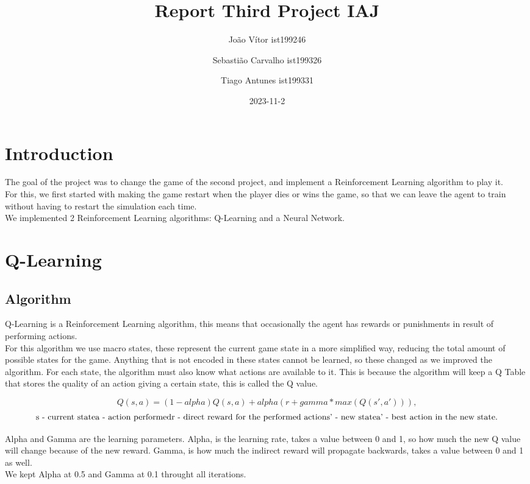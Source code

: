 \documentclass{article}
\title{Report Third Project IAJ}
\author{João Vítor ist199246
  \and Sebastião Carvalho ist199326
  \and Tiago Antunes ist199331}
\date{2023-11-2}
\begin{document}
  \maketitle
  \tableofcontents
  \newpage
  \section{Introduction}
  The goal of the project was to change the game of the second project, and implement a Reinforcement Learning algorithm to play it.\\
  For this, we first started with making the game restart when the player dies or wins the game, so that we can leave the agent to train
  without having to restart the simulation each time.\\
  We implemented 2 Reinforcement Learning algorithms: Q-Learning and a Neural Network.\\
  \section{Q-Learning}
  \subsection{Algorithm}
  Q-Learning is a Reinforcement Learning algorithm, this means that occasionally the agent has rewards or punishments in result of
  performing actions.\\
  For this algorithm we use macro states, these represent the current game state in a more simplified way, reducing the total
  amount of possible states for the game. Anything that is not encoded in these states cannot be learned, so these changed as
  we improved the algorithm. For each state, the algorithm must also know what actions are available to it. This is because the
  algorithm will keep a Q Table that stores the quality of an action giving a certain state, this is called the Q value.

  \[Q(s,a) = (1-alpha)Q(s, a) + alpha(r + gamma * max(Q(s', a'))),\]
  \[\text{s - current state \\a - action performed\\ r - direct reward for the performed action\\ s' - new state\\ a' - best action in the new state.}\]

  Alpha and Gamma are the learning parameters.
  Alpha, is the learning rate, takes a value between 0 and 1, so how much the new Q value will change because of the new reward.
  Gamma, is how much the indirect reward will propagate backwards, takes a value between 0 and 1 as well.\\
  We kept Alpha at 0.5 and Gamma at 0.1 throught all iterations.
  
\end{document}
